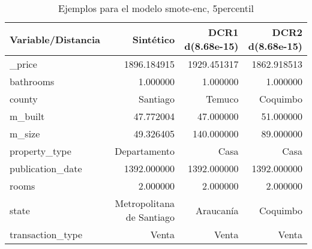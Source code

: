 \begin{table}[H]
\centering
\fontsize{10}{14}\selectfont
\caption{Ejemplos para el modelo smote-enc, 5percentil}
\label{table-example-economicos-b-2-smote-enc-5p}
\begin{tabular}{|l|r|r|r|}
\hline
\rowcolor[gray]{0.8}
Variable/Distancia & Sintético & DCR1 d(8.68e-15) & DCR2 d(8.68e-15) \\
\hline \_price & \cellcolor[rgb]{0.9, 0.54, 0.52} 1896.184915 & 1929.451317 & 1862.918513 \\
\hline bathrooms & \cellcolor[rgb]{0.9, 0.54, 0.52} 1.000000 & \cellcolor[rgb]{0.9, 0.54, 0.52} 1.000000 & \cellcolor[rgb]{0.9, 0.54, 0.52} 1.000000 \\
\hline county & \cellcolor[rgb]{0.9, 0.54, 0.52} Santiago & Temuco & Coquimbo \\
\hline m\_built & \cellcolor[rgb]{0.9, 0.54, 0.52} 47.772004 & 47.000000 & 51.000000 \\
\hline m\_size & \cellcolor[rgb]{0.9, 0.54, 0.52} 49.326405 & 140.000000 & 89.000000 \\
\hline property\_type & \cellcolor[rgb]{0.9, 0.54, 0.52} Departamento & Casa & Casa \\
\hline publication\_date & \cellcolor[rgb]{0.9, 0.54, 0.52} 1392.000000 & \cellcolor[rgb]{0.9, 0.54, 0.52} 1392.000000 & \cellcolor[rgb]{0.9, 0.54, 0.52} 1392.000000 \\
\hline rooms & \cellcolor[rgb]{0.9, 0.54, 0.52} 2.000000 & \cellcolor[rgb]{0.9, 0.54, 0.52} 2.000000 & \cellcolor[rgb]{0.9, 0.54, 0.52} 2.000000 \\
\hline state & \cellcolor[rgb]{0.9, 0.54, 0.52} Metropolitana de Santiago & Araucanía & Coquimbo \\
\hline transaction\_type & \cellcolor[rgb]{0.9, 0.54, 0.52} Venta & \cellcolor[rgb]{0.9, 0.54, 0.52} Venta & \cellcolor[rgb]{0.9, 0.54, 0.52} Venta \\
\hline
\end{tabular}
\end{table}
